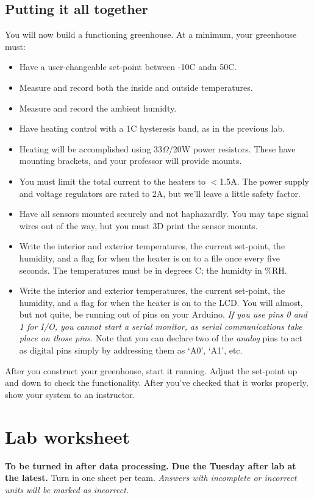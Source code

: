 \documentclass[11pt]{article} %
\begin{document}
\subsection{Putting it all together}

You will now build a functioning greenhouse. At a minimum, your greenhouse must:
\begin{itemize}
\item Have a user-changeable set-point between -10C andn 50C.
\item Measure and record both the inside and outside temperatures.
\item Measure and record the ambient humidty.
\item Have heating control with a 1C hysteresis band, as in the previous lab.
\item Heating will be accomplished using 33$\Omega$/20W power resistors. These have mounting brackets, and your professor will provide mounts.
\item You must limit the total current to the heaters to $<$1.5A. The power supply and voltage regulators are rated to 2A, but we'll leave a little safety factor.
\item Have all sensors mounted securely and not haphazardly. You may tape signal wires out of the way, but you must 3D print the sensor mounts.
\item Write the interior and exterior temperatures, the current set-point, the humidity, and a flag for when the heater is on to a file once every five seconds. The temperatures must be in degrees C; the humidty in \%RH.
\item Write the interior and exterior temperatures, the current set-point, the humidity, and a flag for when the heater is on to the LCD. You will almost, but not quite, be running out of pins on your Arduino. \emph{If you use pins 0 and 1 for I/O, you cannot start a serial monitor, as serial communications take place on those pins.} Note that you can declare two of the \emph{analog} pins to act as digital pins simply by addressing them as `A0', `A1', etc.
\end{itemize}

After you construct your greenhouse, start it running. Adjust the set-point up and down to check the functionality. After you've checked that it works properly, show your system to an instructor.

\clearpage
\pagebreak
\section{Lab worksheet}
{\bf To be turned in after data processing. Due the Tuesday after lab at the latest.} Turn in one sheet per team.
\emph{Answers with incomplete or incorrect units will be marked as incorrect.}
\end{document}
